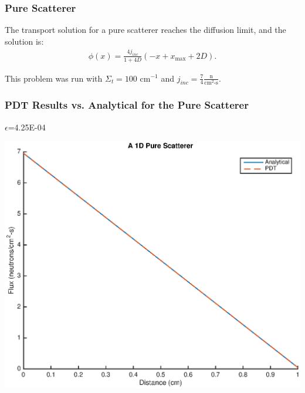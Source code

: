 \documentclass[compress]{beamer}
\newcommand{\backupend}{
   \setcounter{framenumber}{\value{finalframe}}
}
\begin{document}
\begin{frame}[t]\frametitle{Pure Scatterer}
\begin{block}{}
The transport solution for a pure scatterer reaches the diffusion limit, and the solution is:
\begin{align*}
\phi(x) = \frac{4j_{inc}}{1+4D}(-x + x_{\text{max}} + 2D).
\end{align*}
\end{block}
\begin{block}{}
This problem was run with $\Sigma_t = 100 \text{ cm}^{-1}$ and $j_{inc} = \frac{7}{4} \frac{\text{n}}{\text{cm}^2\text{-s}}$. 
\end{block}
\end{frame}

\begin{frame}[t]\frametitle{PDT Results vs. Analytical for the Pure Scatterer}
\begin{minipage}{0.2\textwidth}
\begin{footnotesize}
$\epsilon$=4.25E-04
\end{footnotesize}
\end{minipage}
\begin{minipage}{0.75\textwidth}
\centering
\includegraphics[scale = 0.5]{figures/PureScatterer.eps}
\end{minipage}

\end{frame}


\backupend

%
%



%	
%	
%	
%	
%
\end{document}
